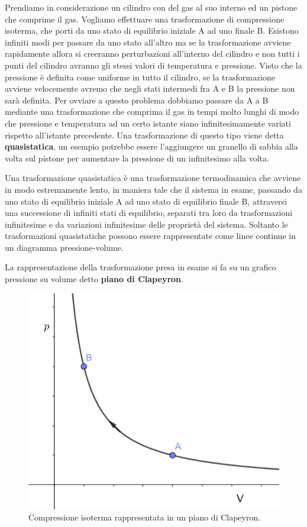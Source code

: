 \documentclass[
10pt, %
a4paper, %
oneside, %
headinclude,footinclude, %
BCOR5mm, %
]{scrartcl}
\begin{document}
Prendiamo in considerazione un cilindro con del gas al suo interno ed un pistone che comprime il gas. Vogliamo effettuare una trasformazione di compressione isoterma, che porti da uno stato di equilibrio iniziale A ad uno finale B. Esistono infiniti modi per passare da uno stato all'altro ma se la trasformazione avviene rapidamente allora si creeranno perturbazioni all'interno del cilindro e non tutti i punti del cilindro avranno gli stessi valori di temperatura e pressione. Visto che la pressione è definita come uniforme in tutto il cilindro, se la trasformazione avviene velocemente avremo che negli stati intermedi fra A e B la pressione non sarà definita. Per ovviare a questo problema dobbiamo passare da A a B mediante una trasformazione che comprima il gas in tempi molto lunghi di modo che pressione e temperatura ad un certo istante siano infinitesimamente variati rispetto all'istante precedente. Una trasformazione di questo tipo viene detta \textbf{quasistatica}, un esempio potrebbe essere l'aggiungere un granello di sabbia alla volta sul pistone per aumentare la pressione di un infinitesimo alla volta. 
\begin{definition}
	Una trasformazione quasistatica è una trasformazione termodinamica che avviene in modo estremamente lento, in maniera tale che il sistema in esame, passando da uno stato di equilibrio iniziale A ad uno stato di equilibrio finale B, attraversi una successione di infiniti stati di equilibrio, separati tra loro da trasformazioni infinitesime e da variazioni infinitesime delle proprietà del sistema. Soltanto le trasformazioni quasistatiche possono essere rappresentate come linee continue in un diagramma pressione-volume.
\end{definition} 
La rappresentazione della trasformazione presa in esame si fa su un grafico pressione su volume detto \textbf{piano di Clapeyron}.
\begin{figure}[h!]
	\centering
	\includegraphics[width=0.5\linewidth]{../images/isoterma}
	\caption{Compressione isoterma rappresentata in un piano di Clapeyron.}
	\label{fig:isoterma}
\end{figure}
\end{document}
